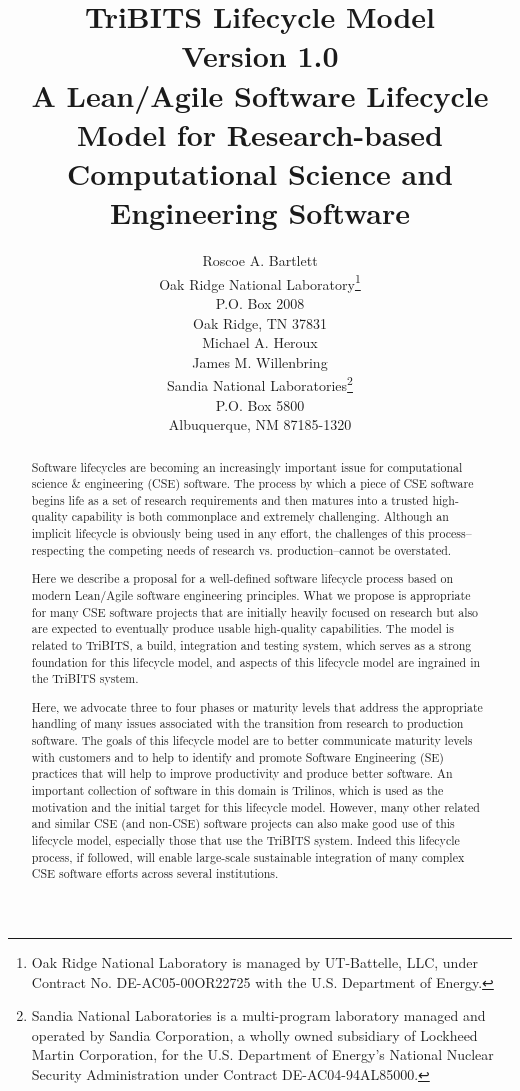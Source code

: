 \documentclass[11pt]{SANDreport}
\title{
TriBITS Lifecycle Model \\[2ex] Version 1.0 \\[2ex] \large A
Lean/Agile Software Lifecycle Model for Research-based Computational
Science and Engineering Software }
\author{
Roscoe A. Bartlett \\ Oak Ridge National Laboratory\footnote{Oak Ridge National Laboratory is managed by UT-Battelle, LLC, under Contract No. DE-AC05-00OR22725 with the U.S. Department of Energy.} \\ P.O. Box 2008 \\ Oak Ridge, TN 37831
\\[2ex] Michael A. Heroux \\ James M. Willenbring \\ Sandia National Laboratories\footnote{Sandia National Laboratories is a  multi-program laboratory managed and operated by Sandia Corporation,  a wholly owned subsidiary of Lockheed Martin Corporation, for the U.S. Department of Energy’s National Nuclear Security Administration under Contract DE-AC04-94AL85000.} \\ P.O. Box 5800 \\ Albuquerque, NM 87185-1320 \\
}
\date{}
\begin{document}

\maketitle

%

%
\begin{abstract}
%

Software lifecycles are becoming an increasingly important issue for computational science \& engineering (CSE) software.  The process by which a piece of CSE software begins life as a set of research requirements and then matures into a trusted high-quality capability is both commonplace and extremely challenging.  Although an implicit lifecycle is obviously being used in any effort, the challenges of this process--respecting the competing needs of research vs. production--cannot be overstated.

Here we describe a proposal for a well-defined software lifecycle process based on modern Lean/Agile software engineering principles. What we propose is appropriate for many CSE software projects that are initially heavily focused on research but also are expected to eventually produce usable high-quality capabilities.  The model is related to TriBITS, a build, integration and testing system, which serves as a strong foundation for this lifecycle model, and aspects of this lifecycle model are ingrained in the TriBITS system.

Here, we advocate three to four phases or maturity levels that address the appropriate handling of many issues associated with the transition from research to production software.  The goals of this lifecycle model are to better communicate maturity levels with customers and to help to identify and promote Software Engineering (SE) practices that will help to improve productivity and produce better software.  An important collection of software in this domain is Trilinos, which is used as the motivation and the initial target for this lifecycle model.  However, many other related and similar CSE (and non-CSE) software projects can also make good use of this lifecycle model, especially those that use the TriBITS system.  Indeed this lifecycle process, if followed, will enable large-scale sustainable integration of many complex CSE software efforts across several institutions.

%
\end{abstract}
%
\end{document}
